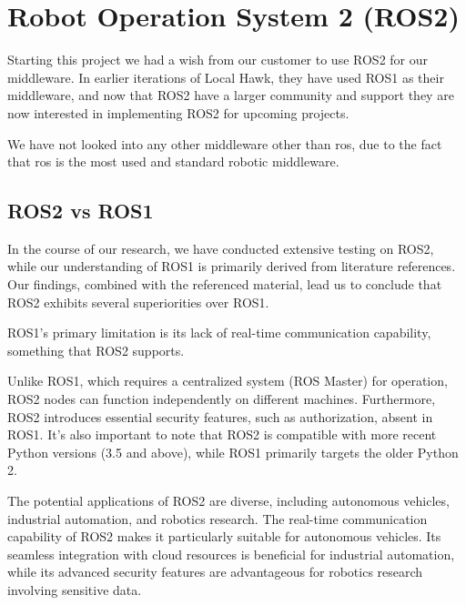 \section{Robot Operation System 2 (ROS2)}

Starting this project we had a wish from our customer to use ROS2 for our middleware. In earlier iterations of Local Hawk, they have used ROS1 as their middleware, and now that ROS2 have a larger community and support they are now interested in implementing ROS2 for upcoming projects. 

We have not looked into any other middleware other than ros, due to the fact that ros is the most used and standard robotic middleware. \cite{ros2standard}

\subsection{ROS2 vs ROS1}
In the course of our research, we have conducted extensive testing on ROS2, while our understanding of ROS1 is primarily derived from literature references. Our findings, combined with the referenced material, lead us to conclude that ROS2 exhibits several superiorities over ROS1.

ROS1's primary limitation is its lack of real-time communication capability, something that ROS2 supports. \cite{ros2real}

Unlike ROS1, which requires a centralized system (ROS Master) for operation, ROS2 nodes can function independently on different machines. Furthermore, ROS2 introduces essential security features, such as authorization, absent in ROS1. It's also important to note that ROS2 is compatible with more recent Python versions (3.5 and above), while ROS1 primarily targets the older Python 2. \cite{ros2perform}

The potential applications of ROS2 are diverse, including autonomous vehicles, industrial automation, and robotics research. The real-time communication capability of ROS2 makes it particularly suitable for autonomous vehicles. Its seamless integration with cloud resources is beneficial for industrial automation, while its advanced security features are advantageous for robotics research involving sensitive data.



\section{}